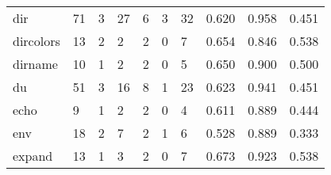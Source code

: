 \begin{longtable}{lp{1.3cm}p{1.3cm}p{1.3cm}p{1.3cm}p{1.3cm}p{1.3cm}p{1.3cm}p{1.3cm}p{1.3cm}}
dir       &                     71 &                                             3 &                                           27 &                                           6 &                                            3 &                                         32 &                                0.620 &                                  0.958 &                                0.451 \\
dircolors &                     13 &                                             2 &                                            2 &                                           2 &                                            0 &                                          7 &                                0.654 &                                  0.846 &                                0.538 \\
dirname   &                     10 &                                             1 &                                            2 &                                           2 &                                            0 &                                          5 &                                0.650 &                                  0.900 &                                0.500 \\
du        &                     51 &                                             3 &                                           16 &                                           8 &                                            1 &                                         23 &                                0.623 &                                  0.941 &                                0.451 \\
echo      &                      9 &                                             1 &                                            2 &                                           2 &                                            0 &                                          4 &                                0.611 &                                  0.889 &                                0.444 \\
env       &                     18 &                                             2 &                                            7 &                                           2 &                                            1 &                                          6 &                                0.528 &                                  0.889 &                                0.333 \\
expand    &                     13 &                                             1 &                                            3 &                                           2 &                                            0 &                                          7 &                                0.673 &                                  0.923 &                                0.538 \\

\end{longtable}
